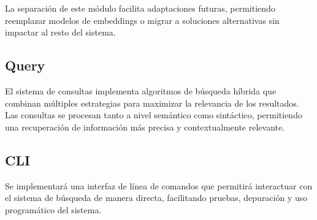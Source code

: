 La separación de este módulo facilita adaptaciones futuras, permitiendo reemplazar modelos de embeddings o migrar a soluciones alternativas sin impactar al resto del sistema.

\subsection{Query}

El sistema de consultas implementa algoritmos de búsqueda híbrida que combinan múltiples estrategias para maximizar la relevancia de los resultados. Las consultas se procesan tanto a nivel semántico como sintáctico, permitiendo una recuperación de información más precisa y contextualmente relevante.

\subsection{CLI}

Se implementará una interfaz de línea de comandos que permitirá interactuar con el sistema de búsqueda de manera directa, facilitando pruebas, depuración y uso programático del sistema.
